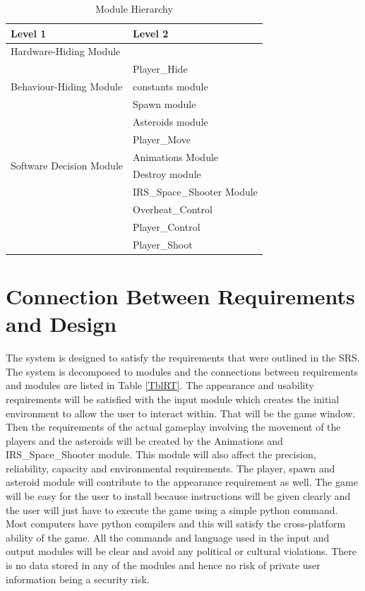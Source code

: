 \documentclass[12pt, titlepage]{article}
\begin{document}
\begin{table}[h!]
\centering
\begin{tabular}{p{} p{}}
\toprule
\textbf{Level 1} & \textbf{Level 2}\\
\midrule

{Hardware-Hiding Module} & ~ \\
\midrule

\multirow{3}{0.3\textwidth}{Behaviour-Hiding Module} 
& Player\_Hide\\
& constants module\\
& Spawn module \\
& Asteroids module\\
& Player\_Move\\
\midrule

\multirow{2}{0.3\textwidth}{Software Decision Module} 
& Animations Module\\
& Destroy module\\
& IRS\_Space\_Shooter Module\\
& Overheat\_Control\\
& Player\_Control\\
& Player\_Shoot\\
\bottomrule

\end{tabular}
\caption{Module Hierarchy}
\label{TblMH}
\end{table}

\section{Connection Between Requirements and Design} \label{SecConnection}
The system is designed to satisfy the requirements that were outlined in the SRS. The system is decomposed to modules and the connections between requirements and modules are listed in Table \ref{TblRT}. The appearance and usability requirements will be satisfied with the input module which creates the initial environment to allow the user to interact within. That will be the game window. Then the requirements of the actual gameplay involving the movement of the players and the asteroids will be created by the Animations and IRS\_Space\_Shooter module. This module will also affect the precision, reliability, capacity and environmental requirements. The player, spawn and asteroid module will contribute to the appearance requirement as well. The game will be easy for the user to install because instructions will be given clearly and the user will just have to execute the game using a simple python command. Most computers have python compilers and this will satisfy the cross-platform ability of the game. All the commands and language used in the input and output modules will be clear and avoid any political or cultural violations. There is no data stored in any of the modules and hence no risk of private user information being a security risk. 
\end{document}
